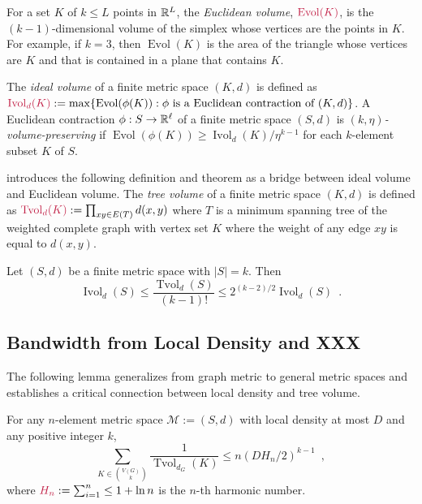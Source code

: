 \documentclass{patmorin}
\makeatletter
\newcommand{\defin}[1]{\emph{\textcolor{brightmaroon}{#1}}}
\def\mathcolor#1#{\@mathcolor{#1}}
\def\@mathcolor#1#2#3{%
  \protect\leavevmode
  \begingroup
    \color#1{#2}#3%
  \endgroup
}
\newcommand{\mathdefin}[1]{\mathcolor{brightmaroon}{#1}}
\DeclareMathOperator{\evol}{Evol}
\DeclareMathOperator{\ivol}{Ivol}
\DeclareMathOperator{\tvol}{Tvol}
\makeatother
\begin{document}
For a set $K$ of $k\le L$ points in $\mathbb{R}^L$, the \defin{Euclidean volume}, $\mathdefin{\evol(K)}$, is the $(k-1)$-dimensional volume of the simplex whose vertices are the points in $K$.  For example, if $k=3$, then $\evol(K)$ is the area of the triangle whose vertices are $K$ and that is contained in a plane that contains $K$.

The \defin{ideal volume} of a finite metric space $(K,d)$ is defined as $\mathdefin{\ivol_d(K)}:=\max\{\evol(\phi(K)):\text{$\phi$ is a Euclidean contraction of $(K,d)$}\}$.  A Euclidean contraction $\phi:S\to\mathbb{R}^{\ell}$ of a finite metric space $(S,d)$ is \defin{$(k,\eta)$-volume-preserving} if $\evol(\phi(K))\ge \ivol_d(K)/\eta^{k-1}$ for each $k$-element subset $K$ of $S$.

\citet{feige:approximating} introduces the following definition and theorem as a bridge between ideal volume and Euclidean volume. The \defin{tree volume} of a finite metric space $(K,d)$ is defined as $\mathdefin{\tvol_d(K)}:=\prod_{xy\in E(T)} d(x,y)$ where $T$ is a minimum spanning tree of the weighted complete graph with vertex set $K$ where the weight of any edge $xy$ is equal to $d(x,y)$.

\begin{lem}
  Let $(S,d)$ be a finite metric space with $|S|=k$.  Then
  \[
    \ivol_{d}(S) \le \frac{\tvol_d(S)}{(k-1)!} \le 2^{(k-2)/2}\ivol_d(S) \enspace .
  \]
\end{lem}

\subsection{Bandwidth from Local Density and XXX}

The following lemma generalizes \citet[Theorem~10]{feige:approximating} from graph metric to general metric spaces and establishes a critical connection between local density and tree volume.

\begin{lem}\label{reciprocal_sum}
  For any $n$-element metric space $\mathcal{M}:=(S,d)$ with local density at most $D$ and any positive integer $k$,
  \[
    \sum_{K\in \binom{V(G)}{k}}\frac{1}{\tvol_{d_G}(K)}\le n(DH_n/2)^{k-1} \enspace ,
  \]
  where $\mathdefin{H_n}:=\sum_{i=1}^n\le 1+\ln n$ is the $n$-th harmonic number.
\end{lem}
\end{document}
